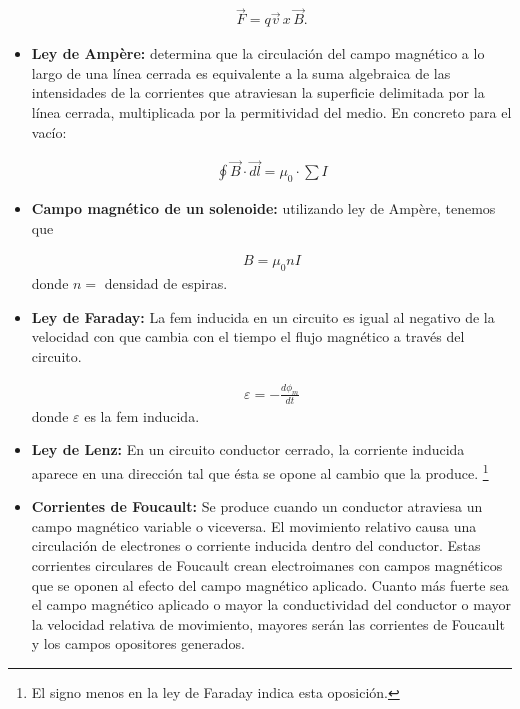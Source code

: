 \documentclass[]{article}
\begin{document}
\begin{multicols*}{2}
\begin{itemize}
    \begin{align}
        \overrightarrow{F} =  q\overrightarrow{v} \, x \, \overrightarrow{B}.
        \label{eq: Lorentz}
    \end{align}
    
    \item \textbf{Ley de Ampère: }\cite{Ley-de-Ampere} determina que la circulación del campo magnético a lo largo de una línea cerrada es equivalente a la suma algebraica de las intensidades 
    de la corrientes que atraviesan la superficie delimitada por la línea cerrada, multiplicada por la permitividad del medio. En concreto para el vacío:
    
    \begin{align}
        \oint \overrightarrow{B} \cdot \overrightarrow{dl} = \mu_{0} \cdot \sum I
        \label{eq: Ampere}
    \end{align}
    
    \item \textbf{Campo magnético de un solenoide:} utilizando ley de Ampère, tenemos que
    
    \begin{align}
        B = \mu_{0}nI
        \label{eq: solenoide}
    \end{align}  
    donde $n = $ densidad de espiras.
    
    
    \item \textbf{Ley de Faraday: }\cite{Ley-de-Faraday} La fem inducida en un circuito es igual al negativo de la velocidad  con que cambia con el tiempo el flujo
    magnético a través del circuito.
    
    \begin{align}
        \varepsilon = -\frac{d\phi_{m}}{dt}
        \label{eq: Faraday}
    \end{align}
    donde $\varepsilon$ es la fem inducida.
    
    \item \textbf{Ley de Lenz: }En un circuito conductor cerrado, la corriente inducida aparece en una dirección tal que ésta se opone al
    cambio que la produce. \footnote[2]{El signo menos en la ley de Faraday \cite{Ley-de-Faraday} indica esta oposición.}

    \item \textbf{Corrientes de Foucault: }\cite{Corrientes-de-Foucault} Se produce cuando un conductor atraviesa un campo magnético variable o viceversa. El movimiento relativo causa una circulación de electrones o corriente inducida dentro del conductor. 
    Estas corrientes circulares de Foucault crean electroimanes con campos magnéticos que se oponen al efecto del campo magnético aplicado. Cuanto más fuerte sea el campo magnético aplicado o mayor la conductividad del conductor o mayor la velocidad relativa de movimiento, 
    mayores serán las corrientes de Foucault y los campos opositores generados.
\end{itemize}





\end{multicols*}
\end{document}
